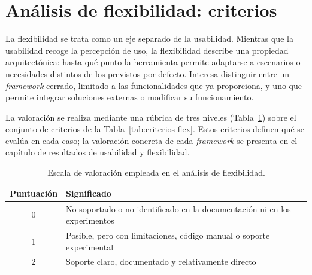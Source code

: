 \FloatBarrier
\section{Análisis de flexibilidad: criterios}\label{sec:criterios-flexibilidad}

La flexibilidad se trata como un eje separado de la usabilidad. Mientras que la usabilidad recoge
la percepción de uso, la flexibilidad describe una propiedad arquitectónica: hasta qué punto la
herramienta permite adaptarse a escenarios o necesidades distintos de los previstos por defecto.
Interesa distinguir entre un \textit{framework} cerrado, limitado a las funcionalidades que ya
proporciona, y uno que permite integrar soluciones externas o modificar su funcionamiento.

La valoración se realiza mediante una rúbrica de tres niveles (Tabla~\ref{tab:escala-flex}) sobre
el conjunto de criterios de la Tabla~\ref{tab:criterios-flex}. Estos criterios definen qué se
evalúa en cada caso; la valoración concreta de cada \textit{framework} se presenta en el capítulo
de resultados de usabilidad y flexibilidad.

\begin{table}[htbp]
  \centering
  \small
  \caption{Escala de valoración empleada en el análisis de flexibilidad.}
  \label{tab:escala-flex}
  \begin{tabular}{cl}
    \toprule
    Puntuación & Significado \\
    \midrule
    0 & No soportado o no identificado en la documentación ni en los experimentos \\
    1 & Posible, pero con limitaciones, código manual o soporte experimental \\
    2 & Soporte claro, documentado y relativamente directo \\
    \bottomrule
  \end{tabular}
\end{table}

